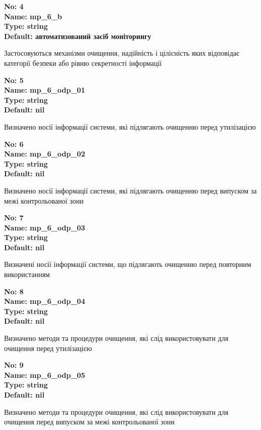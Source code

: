 \documentclass{article}
\begin{document}
{\footnotesize\bfseries
No: 4\\
Name: mp\_\allowbreak{}6\_\allowbreak{}b\\
Type: string\\
Default: \textquotedbl{}автоматизований засіб моніторингу\textquotedbl{}
}

{\footnotesize Застосовуються механізми очищення, надійність і цілісність яких відповідає категорії безпеки або рівню секретності інформації}


{\footnotesize\bfseries
No: 5\\
Name: mp\_\allowbreak{}6\_\allowbreak{}odp\_\allowbreak{}01\\
Type: string\\
Default: nil
}

{\footnotesize Визначено носії інформації системи, які підлягають очищенню перед утилізацією}


{\footnotesize\bfseries
No: 6\\
Name: mp\_\allowbreak{}6\_\allowbreak{}odp\_\allowbreak{}02\\
Type: string\\
Default: nil
}

{\footnotesize Визначено носії інформації системи, які підлягають очищенню перед випуском за межі контрольованої зони}


{\footnotesize\bfseries
No: 7\\
Name: mp\_\allowbreak{}6\_\allowbreak{}odp\_\allowbreak{}03\\
Type: string\\
Default: nil
}

{\footnotesize Визначені носії інформації системи, що підлягають очищенню перед повторним використанням}


{\footnotesize\bfseries
No: 8\\
Name: mp\_\allowbreak{}6\_\allowbreak{}odp\_\allowbreak{}04\\
Type: string\\
Default: nil
}

{\footnotesize Визначено методи та процедури очищення, які слід використовувати для очищення перед утилізацією}


{\footnotesize\bfseries
No: 9\\
Name: mp\_\allowbreak{}6\_\allowbreak{}odp\_\allowbreak{}05\\
Type: string\\
Default: nil
}

{\footnotesize Визначено методи та процедури очищення, які слід використовувати для очищення перед випуском за межі контрольованої зони}
\end{document}
